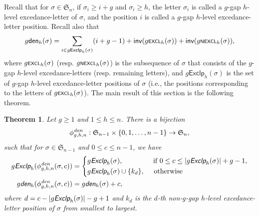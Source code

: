 \documentclass[12pt]{article}
\newtheorem{theorem}{Theorem}[section]
\begin{document}
Recall that for $\sigma\in\mathfrak{S}_{n}$, if $\sigma_{i}\geq i+g$ and $\sigma_{i}\geq h$,
the letter $\sigma_{i}$ is called a $g$-gap $h$-level excedance-letter of $\sigma$,
and the position $i$ is called a $g$-gap $h$-level excedance-letter position.
Recall also  that
\begin{align*}
	g\textsf{den}_{h}(\sigma)=\sum_{i\in g\textsf{Exclp}_{h}(\sigma)}(i+g-1)+\textsf{inv}(g\textsf{\scriptsize{EXCL}}_{h}(\sigma))+\textsf{inv}(g\textsf{\scriptsize{NEXCL}}_{h}(\sigma)),
\end{align*}
where 
$g\textsf{\scriptsize{EXCL}}_{h}(\sigma)$ (resp. $g\textsf{\scriptsize{NEXCL}}_{h}(\sigma)$) is the subsequence of $\sigma$  that consists of the $g$-gap $h$-level excedance-letters (resp.  remaining letters),
and $g\textsf{Exclp}_{h}(\sigma)$ is the set of $g$-gap $h$-level excedance-letter positions of $\sigma$ (i.e., the positions corresponding to the letters of $g\textsf{\scriptsize{EXCL}}_{h}(\sigma)$).
The main result of this section is the following theorem.
\begin{theorem}\label{Thm-bijection-denl}
	Let $g\geq1$ and $1\leq h\leq n$.
	There is a bijection $$\phi_{g,h,n}^{\emph{\text{den}}}: \mathfrak{S}_{n-1}\times\{0,1,\ldots,n-1\}\rightarrow\mathfrak{S}_{n},$$
	such that for $\sigma\in\mathfrak{S}_{n-1}$ and $0\leq c\leq n-1$, 
	we have 
\begin{equation}\label{eq-(Excr,denl)-all}
\begin{split}
g\emph{\textsf{Exclp}}_{h}(\phi_{g,h,n}^{\emph{\text{den}}}(\sigma,c))&=
\left\{
\begin{aligned}
	&g\emph{\textsf{Exclp}}_{h}(\sigma), \quad\quad\quad\quad~\text{if~}0\leq c\leq |g\emph{\textsf{Exclp}}_{h}(\sigma)|+g-1,\\
	&g\emph{\textsf{Exclp}}_{h}(\sigma)\cup\{k_{d}\},\quad\text{~otherwise}
\end{aligned}
\right.\\
g\emph{\textsf{den}}_{h}(\phi_{g,h,n}^{\emph{\text{den}}}(\sigma,c))&=g\emph{\textsf{den}}_{h}(\sigma)+c,
	\end{split}
\end{equation}	
where $d=c-|g\emph{\textsf{Exclp}}_{h}(\sigma)|-g+1$ and
$k_{d}$ is the $d$-th non-$g$-gap $h$-level excedance-letter position of $\sigma$ from smallest to largest.
\end{theorem}
\end{document}
